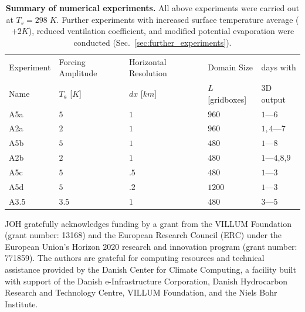 \documentclass[draft,linenumbers]{agujournal2019}
\begin{document}
\begin{table}[]
\begin{tabular}{lllll}
Experiment & Forcing Amplitude & Horizontal Resolution & Domain Size & days with\\
Name & $T_a$ [$K$] & $dx$ [$km$] & $L$ [gridboxes] & 3D output\\
\hline
A5a & $5$ & $1$ & $960$ & $1$---$6$ \\
A2a & $2$ & $1$ & $960$ & $1,4$---$7$ \\
A5b & $5$ & $1$ & $480$ &  $1$---$8$\\
A2b & $2$ & $1$ & $480$ &  $1$---$4$,$8$,$9$\\
A5c & $5$ & $.5$ & $480$ & $1$---$3$ \\
A5d & $5$ & $.2$ & $1200$ & $1$---$3$ \\
A3.5 & $3.5$ & $1$ & $480$ & $3$---$5$\\
 \hline
\end{tabular}
\caption{{\bf Summary of numerical experiments.}
All above experiments were carried out at $T_s=298\;K$. Further experiments with increased surface temperature average ($+2K$), reduced ventilation coefficient, and modified potential evaporation were conducted (Sec.~\ref{sec:further_experiments}). }
\label{tab:experiments}
\end{table}


\acknowledgments
JOH gratefully acknowledges funding by a grant from the VILLUM Foundation (grant number: 13168) and the European Research Council (ERC) under the European Union's Horizon 2020 research and innovation program (grant number: 771859).
The authors are grateful for computing resources and technical assistance provided by the Danish Center for Climate Computing, a facility built with support of the Danish e-Infrastructure Corporation, Danish Hydrocarbon Research and Technology Centre, VILLUM Foundation, and the Niels Bohr Institute.

\clearpage
\newpage
\pagebreak




%
%
%
%
%
\end{document}
